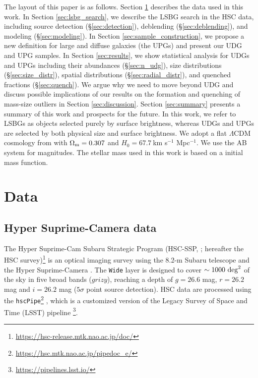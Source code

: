 \documentclass[twocolumn,astrosymb,twocolappendix]{aastex631}
\newcommand{\code}[1]{\texttt{#1}}
\begin{document}
\begin{CJK*}{UTF8}{gbsn}
The layout of this paper is as follows. Section \ref{sec:data} describes the data used in this work. In Section \ref{sec:lsbg_search}, we describe the LSBG search in the HSC data, including source detection (\S \ref{sec:detection}), deblending (\S \ref{sec:deblending}), and modeling (\S \ref{sec:modeling}). In Section \ref{sec:sample_construction}, we propose a new definition for large and diffuse galaxies (the UPGs) and present our UDG and UPG samples. In Section \ref{sec:results}, we show statistical analysis for UDGs and UPGs including their abundances (\S \ref{sec:n_udg}), size distributions (\S \ref{sec:size_distr}), spatial distributions (\S \ref{sec:radial_distr}), and quenched fractions (\S \ref{sec:quench}). We argue why we need to move beyond UDG and discuss possible implications of our results on the formation and quenching of mass-size outliers in Section \ref{sec:discussion}. Section \ref{sec:summary} presents a summary of this work and prospects for the future. In this work, we refer to LSBGs as objects selected purely by surface brightness, whereas UDGs and UPGs are selected by both physical size and surface brightness. We adopt a flat $\Lambda$CDM cosmology from \citet{Planck15} with $\Omega_{\rm m}= 0.307$ and $H_0 = 67.7\ $km s$^{-1}$ Mpc$^{-1}$. We use the AB system \citep{Oke1983} for magnitudes. The stellar mass used in this work is based on a \citet{Chabrier2003} initial mass function.


\section{Data} \label{sec:data}
\subsection{Hyper Suprime-Camera data}
The Hyper Suprime-Cam Subaru Strategic Program (HSC-SSP, \citealt{Aihara2018}; hereafter the HSC survey)\footnote{\url{https://hsc-release.mtk.nao.ac.jp/doc/}} is an optical imaging survey using the 8.2-m Subaru telescope and the Hyper Suprime-Camera \citep{Miyazaki2012, Miyazaki2018}. The \texttt{Wide} layer is designed to cover $\sim 1000\ \rm{deg}^{2}$ of the sky in five broad bands ($grizy$), reaching a depth of $g=26.6$ mag, $r=26.2$ mag and $i=26.2$ mag ($5\sigma$ point source detection). HSC data are processed using the \code{hscPipe}\footnote{\url{https://hsc.mtk.nao.ac.jp/pipedoc_e/}} \citep{Bosch2018}, which is a customized version of the Legacy Survey of Space and Time (LSST) pipeline \citep{LSST-pipeline}\footnote{\url{https://pipelines.lsst.io/}}.


\end{CJK*}
\end{document}
